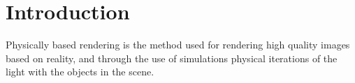 \documentclass[../specula.tex]{subfiles}
\begin{document}
\section{Introduction}\label{sec:introduction}
Physically based rendering is the method used for rendering high quality
images based on reality, and through the use of simulations physical
iterations of the light with the objects in the scene.
\end{document}
